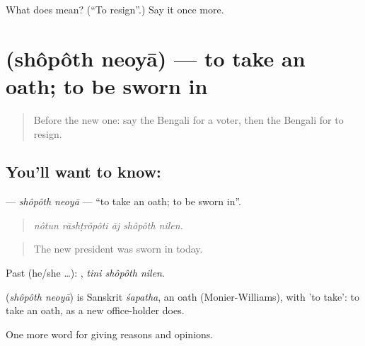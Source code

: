 \begin{tcolorbox}[breakable,colback=teal!4,colframe=teal!35!black,title={Before you move on}]
What does   mean? (\textquotedblleft{}To resign\textquotedblright{}.) Say it once more.
\end{tcolorbox}
\section[\texorpdfstring{\bn{শপথ} \bn{নেওয়া} (shôpôth neoyā)}{শপথ নেওয়া (shôpôth neoyā)}]{  (shôpôth neoyā) — to take an oath; to be sworn in}

\label{lesson:BN-C346-shopoth-neoya}



\begin{quote}
Before the new one: say the Bengali for a voter, then the Bengali for to resign.
\end{quote}

\subsection*{You'll want to know:  }
\textbf{ } — \emph{shôpôth neoyā} — \textquotedblleft{}to take an oath; to be sworn in\textquotedblright{}.

\begin{quote}
    
\end{quote}

\begin{quote}
\emph{nôtun rāshṭrôpôti āj shôpôth nilen.}
\end{quote}

\begin{quote}
The new president was sworn in today.
\end{quote}

Past (he/she …):   , \emph{tini shôpôth nilen}.

\begin{cousinweb}
\textbf{ } (\emph{shôpôth neoyā}) is Sanskrit \emph{śapatha}, an oath (Monier-Williams), with  'to take': to take an oath, as a new office-holder does.
\end{cousinweb}

\begin{grammarlens}[title={What you've built}]
One more word for giving reasons and opinions.
\end{grammarlens}


